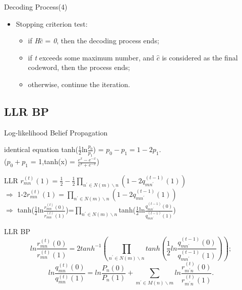 \def\CTeXPreproc{Created by ctex v0.2.12, don't edit!}\documentclass{beamer}
\newcommand{\xieti}{\textsl}
\begin{document}
\begin{frame}
    \begin{block}{Decoding Process(4)}
        \begin{itemize}
        \item Stopping criterion test:
            \begin{itemize}
            \item if \xieti{H}$\hat{c}$ = \xieti{0}, then the decoding process ends;
            \item if \xieti{t} exceeds some maximum number, and $\hat{c}$ is considered as the final codeword, then the process ends;
            \item otherwise, continue the iteration.
            \end{itemize}
        \end{itemize}
    \end{block}
\end{frame}

\subsection{LLR BP}

\begin{frame}{Log-likelihood Belief Propagation}
    \begin{block}{identical equation}
        tanh($\frac{1}{2}$ln$\frac{p_0}{p_1}$) = $p_0-p_1=1-2p_1$.
        \\($p_0+p_1$ = 1,tanh(x) = $\frac{e^x-e^{-x}}{e^x+e^{-x}}$)
    \end{block}
    \begin{block}{LLR}
            $r_{mn}^{(t)}(1)=\frac{1}{2}-\frac{1}{2}\prod_{n^\prime\in N(m)\backslash n}(1-2q_{mn^\prime}^{(t-1)}(1))$\\
            $\Rightarrow$ 1-2$r_{mn}^{(t)}(1)=\prod_{n^\prime\in N(m)\backslash n}(1-2q_{mn^\prime}^{(t-1)}(1))$\\
            $\Rightarrow $ tanh($\frac{1}{2}$ln$\frac{r_{mn}^{(t)}(0)}{r_{mn}^{(t)}(1)}$)=$\prod_{n^\prime\in N(m)\backslash n}$tanh($\frac{1}{2}$ln$\frac{q_{mn^\prime}^{(t-1)}(0)}{q_{mn^\prime}^{(t-1)}(1)}$)
    \end{block}
\end{frame}
\begin{frame}
    \begin{block}{LLR BP}
        \begin{equation}
        ln\frac{r_{mn}^{(t)}(0)}{r_{mn}^{(t)}(1)}=2tanh^{-1}(\prod_{n^\prime\in N(m)\backslash
        n}tanh(\frac{1}{2}ln\frac{q_{mn^\prime}^{(t-1)}(0)}{q_{mn^\prime}^{(t-1)}(1)}));
        \end{equation}
        \begin{equation}
        ln\frac{q_{mn}^{(t)}(0)}{q_{mn}^{(t)}(1)}=ln\frac{P_n(0)}{P_n(1)}+\sum_{m^\prime\in M(n)\backslash
        m}ln\frac{r_{m^\prime n}^{(t)}(0)}{r_{m^\prime n}^{(t)}(1)}.
        \end{equation}
    \end{block}
\end{frame}
\end{document}
